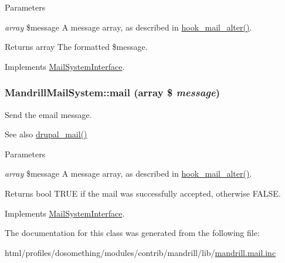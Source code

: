 \begin{DoxyParams}{Parameters}
\item[{\em array}]\$message A message array, as described in \hyperlink{group__hooks_gaad1d55a8e7b359933f462a9ca5b2ede0}{hook\_\-mail\_\-alter()}.\end{DoxyParams}
\begin{DoxyReturn}{Returns}
array The formatted \$message. 
\end{DoxyReturn}


Implements \hyperlink{interfaceMailSystemInterface_a430f4c9b4c5f3825f6a9ec73e7b5e5d6}{MailSystemInterface}.\hypertarget{classMandrillMailSystem_a2d56986dfa5ce08e134344078710cf23}{
\subsubsection[{mail}]{\setlength{\rightskip}{0pt plus 5cm}MandrillMailSystem::mail (array \$ {\em message})}}
\label{classMandrillMailSystem_a2d56986dfa5ce08e134344078710cf23}
Send the email message.

\begin{DoxySeeAlso}{See also}
\hyperlink{mail_8inc_ab80781fd7273975a77cbbd13300eddbf}{drupal\_\-mail()}
\end{DoxySeeAlso}

\begin{DoxyParams}{Parameters}
\item[{\em array}]\$message A message array, as described in \hyperlink{group__hooks_gaad1d55a8e7b359933f462a9ca5b2ede0}{hook\_\-mail\_\-alter()}.\end{DoxyParams}
\begin{DoxyReturn}{Returns}
bool TRUE if the mail was successfully accepted, otherwise FALSE. 
\end{DoxyReturn}


Implements \hyperlink{interfaceMailSystemInterface_a8dd560f7879b93d1fd3497b27a3b08f7}{MailSystemInterface}.

The documentation for this class was generated from the following file:\begin{DoxyCompactItemize}
\item 
html/profiles/dosomething/modules/contrib/mandrill/lib/\hyperlink{mandrill_8mail_8inc}{mandrill.mail.inc}\end{DoxyCompactItemize}

